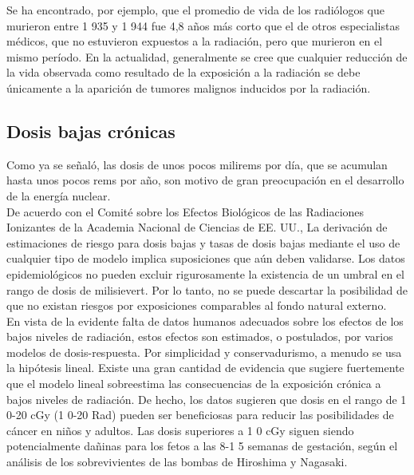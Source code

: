 \documentclass[]{article}
\begin{document}
Se ha encontrado, por ejemplo, que el promedio de vida de los radiólogos que murieron entre 1 935 y 1 944 fue 4,8 años más corto que el de otros especialistas médicos, que no estuvieron expuestos a la radiación, pero que murieron en el mismo período. En la actualidad, generalmente se cree que cualquier reducción de la vida observada como resultado de la exposición a la radiación se debe únicamente a la aparición de tumores malignos inducidos por la radiación.\\

\subsection{Dosis bajas crónicas} 

Como ya se señaló, las dosis de unos pocos milirems por día, que se acumulan hasta unos pocos rems por año, son motivo de gran preocupación en el desarrollo de la energía nuclear.\\


De acuerdo con el Comité sobre los Efectos Biológicos de las Radiaciones Ionizantes de la Academia Nacional de Ciencias de EE. UU., La derivación de estimaciones de riesgo para dosis bajas y tasas de dosis bajas mediante el uso de cualquier tipo de modelo implica suposiciones que aún deben validarse. Los datos epidemiológicos no pueden excluir rigurosamente la existencia de un umbral en el rango de dosis de milisievert. Por lo tanto, no se puede descartar la posibilidad de que no existan riesgos por exposiciones comparables al fondo natural externo.\\


En vista de la evidente falta de datos humanos adecuados sobre los efectos de los bajos niveles de radiación, estos efectos son estimados, o postulados, por varios modelos de dosis-respuesta. Por simplicidad y conservadurismo, a menudo se usa la hipótesis lineal. Existe una gran cantidad de evidencia que sugiere fuertemente que el modelo lineal sobreestima las consecuencias de la exposición crónica a bajos niveles de radiación. De hecho, los datos sugieren que dosis en el rango de 1 0-20 cGy (1 0-20 Rad) pueden ser beneficiosas para reducir las posibilidades de cáncer en niños y adultos. Las dosis superiores a 1 0 cGy siguen siendo potencialmente dañinas para los fetos a las 8-1 5 semanas de gestación, según el análisis de los sobrevivientes de las bombas de Hiroshima y Nagasaki.\\
\end{document}
